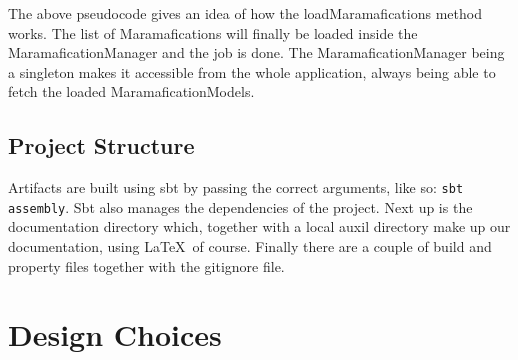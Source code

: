 \documentclass[10pt]{extarticle} %
\begin{document}
    The above pseudocode gives an idea of how the loadMaramafications method works.
    The list of Maramafications will finally be loaded inside the MaramaficationManager and the job is done.
    The MaramaficationManager being a singleton makes it accessible from the whole application, always being able to fetch the loaded MaramaficationModels.

    \subsection{Project Structure}
    Artifacts are built using sbt by passing the correct arguments, like so: \texttt{sbt assembly}.
    Sbt also manages the dependencies of the project.
    Next up is the documentation directory which, together with a local auxil directory make up our documentation, using \LaTeX\ of course.
    Finally there are a couple of build and property files together with the gitignore file.

    \newpage

    \section{Design Choices}
    \label{sec:designchoices}
\end{document}
